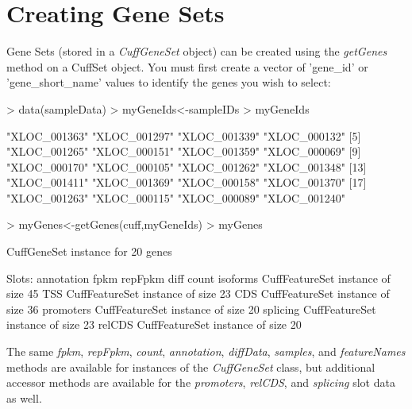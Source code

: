 \documentclass[10pt]{article}
\newcommand{\Rclass}[1]{{\textit{#1}}}
\newcommand{\Rmethod}[1]{{\textit{#1}}}
\begin{document}
\clearpage 

\section{Creating Gene Sets}
Gene Sets (stored in a \Rclass{CuffGeneSet} object) can be created using the \Rmethod{getGenes} method on a CuffSet object.
You must first create a vector of 'gene\_id' or 'gene\_short\_name' values to identify the genes you wish to select:

\begin{Schunk}
\begin{Sinput}
> data(sampleData)
> myGeneIds<-sampleIDs
> myGeneIds
\end{Sinput}
\begin{Soutput}
 [1] "XLOC_001363" "XLOC_001297" "XLOC_001339" "XLOC_000132"
 [5] "XLOC_001265" "XLOC_000151" "XLOC_001359" "XLOC_000069"
 [9] "XLOC_000170" "XLOC_000105" "XLOC_001262" "XLOC_001348"
[13] "XLOC_001411" "XLOC_001369" "XLOC_000158" "XLOC_001370"
[17] "XLOC_001263" "XLOC_000115" "XLOC_000089" "XLOC_001240"
\end{Soutput}
\begin{Sinput}
> myGenes<-getGenes(cuff,myGeneIds)
> myGenes
\end{Sinput}
\begin{Soutput}
CuffGeneSet instance for  20  genes
 
Slots:
	 annotation
	 fpkm
	 repFpkm
	 diff
	 count
	 isoforms	 CuffFeatureSet instance of size 45 
	 TSS		 CuffFeatureSet instance of size 23 
	 CDS		 CuffFeatureSet instance of size 36 
	 promoters		 CuffFeatureSet instance of size 20 
	 splicing		 CuffFeatureSet instance of size 23 
	 relCDS		 CuffFeatureSet instance of size 20 
\end{Soutput}
\end{Schunk}
The same \Rmethod{fpkm}, \Rmethod{repFpkm}, \Rmethod{count}, \Rmethod{annotation}, \Rmethod{diffData}, \Rmethod{samples}, and \Rmethod{featureNames} methods are available for instances of the \Rmethod{CuffGeneSet} class, but additional accessor methods are available for the \Rmethod{promoters}, \Rmethod{relCDS}, and \Rmethod{splicing} slot data as well.
\end{document}
